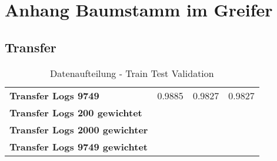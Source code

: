 \chapter{Anhang  Baumstamm im Greifer}
\label{appendix:BaumstammImGreifer}


	\section{Transfer}
	\label{appendix:Transfer}



	\begin{table}[ht]
	\centering
	\begin{tabularx}{\textwidth}{llll}
		\textbf{Transfer Logs 9749} 				 & 	0.9885			& 0.9827	 & 0.9827	\\ \rowcolor{Gray}
		\textbf{Transfer Logs 200 gewichtet}	 	  &  	   &  	\\		
		\textbf{Transfer Logs 2000 gewichter}	 	  &  	   &  	\\	
		\textbf{Transfer Logs 9749 gewichtet}	 	  &  	   &  	\\	
	\end{tabularx}
	\caption{Datenaufteilung - Train Test Validation}
	\label{table:DatenaufteilungTrainTestValidation}
\end{table}